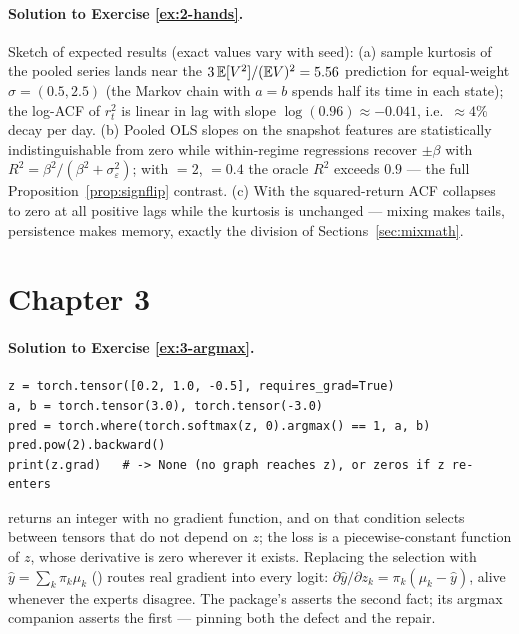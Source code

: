\paragraph{Solution to Exercise \ref{ex:2-hands}.}
Sketch of expected results (exact values vary with seed):
(a) sample kurtosis of the pooled series lands near the
$3\,\mathbb{E}[V^2]/(\mathbb{E} V)^2 = 5.56$ prediction for equal-weight
$\sigma = (0.5, 2.5)$ (the Markov chain with $a = b$ spends half its time
in each state); the log-ACF of $r_t^2$ is linear in lag with slope
$\log(0.96) \approx -0.041$, i.e.\ $\approx 4\%$ decay per day.
(b) Pooled OLS slopes on the snapshot features are statistically
indistinguishable from zero while within-regime regressions recover
$\pm\beta$ with $R^2 = \beta^2/(\beta^2 + \sigma_\varepsilon^2)$; with
${}=2$, ${}=0.4$ the oracle $R^2$
exceeds $0.9$ --- the full Proposition~\ref{prop:signflip} contrast.
(c) With  the squared-return ACF collapses to
zero at all positive lags while the kurtosis is unchanged --- mixing makes
tails, persistence makes memory, exactly the division of
Sections~\ref{sec:mixmath}.

\section*{Chapter 3}

\paragraph{Solution to Exercise \ref{ex:3-argmax}.}
\begin{lstlisting}
z = torch.tensor([0.2, 1.0, -0.5], requires_grad=True)
a, b = torch.tensor(3.0), torch.tensor(-3.0)
pred = torch.where(torch.softmax(z, 0).argmax() == 1, a, b)
pred.pow(2).backward()
print(z.grad)   # -> None (no graph reaches z), or zeros if z re-enters
\end{lstlisting}
 returns an integer with no gradient function, and
 on that condition selects between tensors that do not depend
on $z$; the loss is a piecewise-constant function of $z$, whose derivative
is zero wherever it exists. Replacing the selection with
$\hat y = \sum_k \pi_k \mu_k$ () routes real gradient into every logit:
$\partial \hat y/\partial z_k = \pi_k(\mu_k - \hat y)$, alive whenever the
experts disagree. The package's 
asserts the second fact; its argmax companion asserts the first ---
pinning both the defect and the repair.


